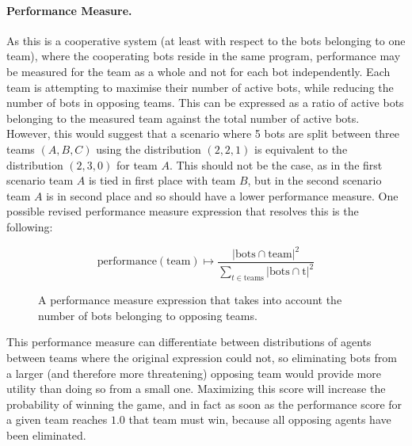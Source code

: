 \documentclass[a4paper,10pt]{article}
\begin{document}
\paragraph{Performance Measure.}
As this is a cooperative system (at least with respect to the bots belonging to one team), where the cooperating bots reside in the same program, performance may be measured for the team as a whole and not for each bot independently. Each team is attempting to maximise their number of active bots, while reducing the number of bots in opposing teams. This can be expressed as a ratio of active bots belonging to the measured team against the total number of active bots. However, this would suggest that a scenario where 5 bots are split between three teams $(A, B, C)$ using the distribution $(2, 2, 1)$ is equivalent to the distribution $(2, 3, 0)$ for team $A$. This should not be the case, as in the first scenario team $A$ is tied in first place with team $B$, but in the second scenario team $A$ is in second place and so should have a lower performance measure. One possible revised performance measure expression that resolves this is the following:

\begin{figure}[ht]
  \centering
  \begin{minipage}{0.8\textwidth}
    $$
      \text{performance}\left(\text{team}\right) \mapsto \frac
        {\left|\text{bots} \cap \text{team}\right|^2}
        {\sum_{t \in \text{teams}} \left|\text{bots} \cap \text{t}\right|^2}
    $$
    \caption{A performance measure expression that takes into account the number of bots belonging to opposing teams.}
  \end{minipage}
\end{figure}

\noindent
This performance measure can differentiate between distributions of agents between teams where the original expression could not, so eliminating bots from a larger (and therefore more threatening) opposing team would provide more utility than doing so from a small one. Maximizing this score will increase the probability of winning the game, and in fact as soon as the performance score for a given team reaches $1.0$ that team must win, because all opposing agents have been eliminated.
\end{document}
